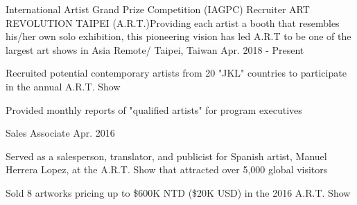 

\begin{cventries}
  \cventry
    {International Artist Grand Prize Competition (IAGPC) Recruiter} %
    {ART REVOLUTION TAIPEI (A.R.T.)\newline \textnormal{Providing each artist a booth that resembles his/her own solo exhibition, this pioneering vision has led A.R.T to be one of the largest art shows in Asia}} %
    {Remote/ Taipei, Taiwan} %
    {Apr. 2018 - Present} %
    {
      \begin{cvitems} %
        \item {Recruited potential contemporary artists from 20 "JKL" countries to participate in the annual A.R.T. Show}
        \item{Provided monthly reports of "qualified artists" for program executives}
      \end{cvitems}
    }






  \cventry
    {Sales Associate} %
    {} %
    {} %
    {Apr. 2016} %
    {
      \begin{cvitems} %
        \item {Served as a salesperson, translator, and publicist for Spanish artist, Manuel Herrera Lopez, \newline at the A.R.T. Show that attracted over 5,000 global visitors}
        \item{Sold 8 artworks pricing up to \$600K NTD (\$20K USD) in the 2016 A.R.T. Show}
      \end{cvitems}
    }

\end{cventries}
